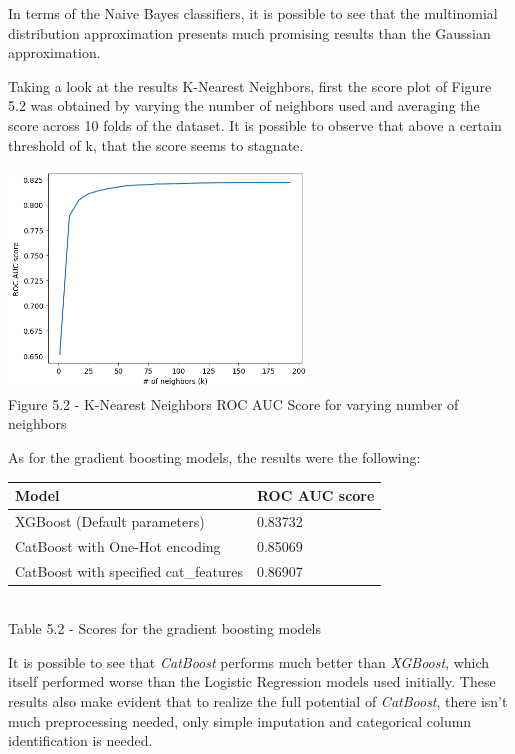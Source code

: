 \documentclass{IEEEtran}
\begin{document}
In terms of the Naive Bayes classifiers, it is possible to see that the multinomial distribution approximation presents much promising results than the Gaussian approximation.

Taking a look at the results K-Nearest Neighbors, first the score plot of Figure 5.2 was obtained by varying the number of neighbors used and averaging the score across 10 folds of the dataset. It is possible to observe that above a certain threshold of k, that the score seems to stagnate.
\begin{center}
    \includegraphics[width=8cm]{figures/KNN_score.png}\\
    Figure 5.2 - K-Nearest Neighbors ROC AUC Score for varying number of neighbors
\end{center}

As for the gradient boosting models, the results were the following:

\begin{center}
    \begin{tabular}{|l|l|}
        \hline
    \textbf{Model} & \textbf{ROC AUC score} \\ 
    \hline \hline
    XGBoost (Default parameters) & 0.83732 \\ \hline
    CatBoost with One-Hot encoding & 0.85069 \\ \hline
    CatBoost with specified cat\_features & 0.86907 \\ \hline
    \end{tabular}\\
    
    \vspace{6pt}
    Table 5.2 - Scores for the gradient boosting models
\end{center}

It is possible to see that \textit{CatBoost} performs much better than \textit{XGBoost}, which itself performed worse than the Logistic Regression models used initially. These results also make evident that to realize the full potential of \textit{CatBoost}, there isn't much preprocessing needed, only simple imputation and categorical column identification is needed.
\end{document}
